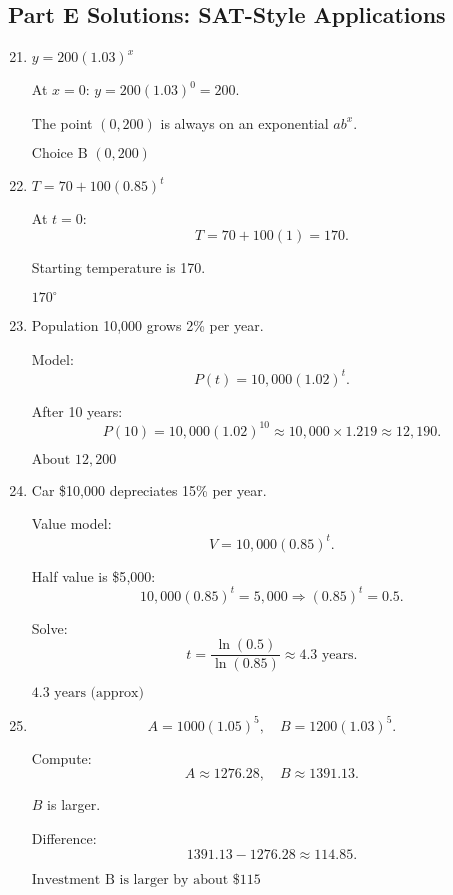 \documentclass[12pt]{article}
\begin{document}
\subsection*{Part E Solutions: SAT-Style Applications}
\begin{enumerate}
  \setcounter{enumi}{20}
  \item \(y = 200(1.03)^x\)

  At \(x = 0\): \(y = 200(1.03)^0 = 200.\)

  The point \((0, 200)\) is always on an exponential \(a b^x\).

  \(\boxed{\text{Choice B } (0, 200)}\)

  \item \(T = 70 + 100(0.85)^t\)

  At \(t = 0\):
  \[
  T = 70 + 100(1) = 170.
  \]

  Starting temperature is 170.

  \(\boxed{170^\circ}\)

  \item Population 10{,}000 grows 2\% per year.

  Model:
  \[
  P(t) = 10{,}000(1.02)^t.
  \]

  After 10 years:
  \[
  P(10) = 10{,}000(1.02)^{10} \approx 10{,}000 \times 1.219 \approx 12{,}190.
  \]

  \(\boxed{\text{About } 12{,}200}\)

  \item Car \$10{,}000 depreciates 15\% per year.

  Value model:
  \[
  V = 10{,}000(0.85)^t.
  \]

  Half value is \$5{,}000:
  \[
  10{,}000(0.85)^t = 5{,}000
  \Rightarrow (0.85)^t = 0.5.
  \]

  Solve:
  \[
  t = \frac{\ln(0.5)}{\ln(0.85)} \approx 4.3 \text{ years}.
  \]

  \(\boxed{4.3 \text{ years (approx)}}\)

  \item
  \[
  A = 1000(1.05)^5, \quad
  B = 1200(1.03)^5.
  \]

  Compute:
  \[
  A \approx 1276.28,
  \quad
  B \approx 1391.13.
  \]

  \(B\) is larger.

  Difference:
  \[
  1391.13 - 1276.28 \approx 114.85.
  \]

  \(\boxed{\text{Investment B is larger by about \$115}}\)
\end{enumerate}
\end{document}
